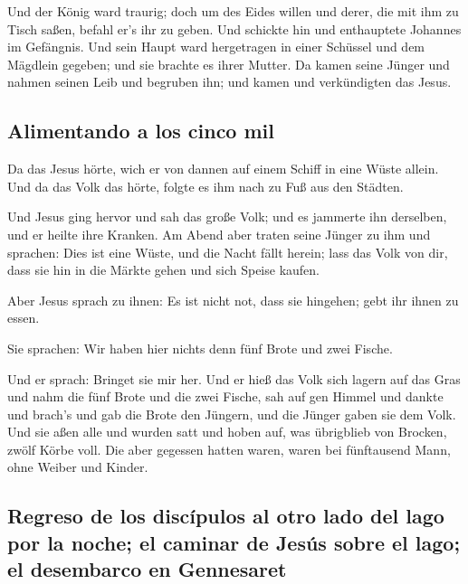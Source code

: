  Und der König ward traurig; doch um des Eides willen und
derer, die mit ihm zu Tisch saßen, befahl er's ihr zu geben.
 Und schickte hin und enthauptete Johannes im Gefängnis.
 Und sein Haupt ward hergetragen in einer Schüssel und
dem Mägdlein gegeben; und sie brachte es ihrer Mutter. 
Da kamen seine Jünger und nahmen seinen Leib und begruben ihn; und kamen
und verkündigten das Jesus.

\hypertarget{alimentando-a-los-cinco-mil}{%
\subsection{Alimentando a los cinco
mil}\label{alimentando-a-los-cinco-mil}}

 Da das Jesus hörte, wich er von dannen auf einem Schiff
in eine Wüste allein. Und da das Volk das hörte, folgte es ihm nach zu
Fuß aus den Städten.

 Und Jesus ging hervor und sah das große Volk; und es
jammerte ihn derselben, und er heilte ihre Kranken.  Am
Abend aber traten seine Jünger zu ihm und sprachen: Dies ist eine Wüste,
und die Nacht fällt herein; lass das Volk von dir, dass sie hin in die
Märkte gehen und sich Speise kaufen.

 Aber Jesus sprach zu ihnen: Es ist nicht not, dass sie
hingehen; gebt ihr ihnen zu essen.

 Sie sprachen: Wir haben hier nichts denn fünf Brote und
zwei Fische.

 Und er sprach: Bringet sie mir her.  Und
er hieß das Volk sich lagern auf das Gras und nahm die fünf Brote und
die zwei Fische, sah auf gen Himmel und dankte und brach's und gab die
Brote den Jüngern, und die Jünger gaben sie dem Volk. 
Und sie aßen alle und wurden satt und hoben auf, was übrigblieb von
Brocken, zwölf Körbe voll.  Die aber gegessen hatten
waren, waren bei fünftausend Mann, ohne Weiber und Kinder.

\hypertarget{regreso-de-los-discuxedpulos-al-otro-lado-del-lago-por-la-noche-el-caminar-de-jesuxfas-sobre-el-lago-el-desembarco-en-gennesaret}{%
\subsection{Regreso de los discípulos al otro lado del lago por la
noche; el caminar de Jesús sobre el lago; el desembarco en
Gennesaret}\label{regreso-de-los-discuxedpulos-al-otro-lado-del-lago-por-la-noche-el-caminar-de-jesuxfas-sobre-el-lago-el-desembarco-en-gennesaret}}

